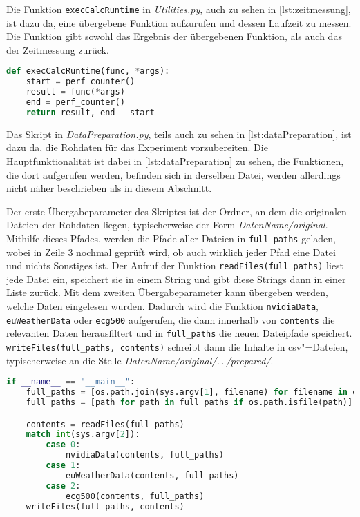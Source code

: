Die Funktion \lstinline|execCalcRuntime| in \textit{Utilities.py}, auch zu sehen in \autoref{lst:zeitmessung}, ist dazu da, eine übergebene Funktion aufzurufen und dessen Laufzeit zu messen. Die Funktion gibt sowohl das Ergebnis der übergebenen Funktion, als auch das der Zeitmessung zurück.
\begin{lstlisting}[caption=Funktion zur Zeitmessung, language=Python, label=lst:zeitmessung, style=Python]
def execCalcRuntime(func, *args):
    start = perf_counter()
    result = func(*args)
    end = perf_counter()
    return result, end - start
\end{lstlisting}

Das Skript in \textit{DataPreparation.py}, teils auch zu sehen in \autoref{lst:dataPreparation}, ist dazu da, die Rohdaten für das Experiment vorzubereiten. Die Hauptfunktionalität ist dabei in \autoref{lst:dataPreparation} zu sehen, die Funktionen, die dort aufgerufen werden, befinden sich in derselben Datei, werden allerdings nicht näher beschrieben als in diesem Abschnitt.

Der erste Übergabeparameter des Skriptes ist der Ordner, an dem die originalen Dateien der Rohdaten liegen, typischerweise der Form \textit{DatenName/original}. Mithilfe dieses Pfades, werden die Pfade aller Dateien in \lstinline|full_paths| geladen, wobei in Zeile 3 nochmal geprüft wird, ob auch wirklich jeder Pfad eine Datei und nichts Sonstiges ist. Der Aufruf der Funktion \lstinline|readFiles(full_paths)| liest jede Datei ein, speichert sie in einem String und gibt diese Strings dann in einer Liste zurück. Mit dem zweiten Übergabeparameter kann übergeben werden, welche Daten eingelesen wurden. Dadurch wird die Funktion \lstinline|nvidiaData|, \lstinline|euWeatherData| oder \lstinline|ecg500| aufgerufen, die dann innerhalb von \lstinline|contents| die relevanten Daten herausfiltert und in \lstinline|full_paths| die neuen Dateipfade speichert. \lstinline|writeFiles(full_paths, contents)| schreibt dann die Inhalte in csv"=Dateien, typischerweise an die Stelle \textit{DatenName/original/.\,.\,/prepared/}.
\begin{lstlisting}[caption=Funktion zur Zeitmessung, language=Python, label=lst:dataPreparation, style=Python]
if __name__ == "__main__":
    full_paths = [os.path.join(sys.argv[1], filename) for filename in os.listdir(sys.argv[1])]
    full_paths = [path for path in full_paths if os.path.isfile(path)]

    contents = readFiles(full_paths)
    match int(sys.argv[2]):
        case 0:
            nvidiaData(contents, full_paths)
        case 1:
            euWeatherData(contents, full_paths)
        case 2:
            ecg500(contents, full_paths)
    writeFiles(full_paths, contents)
\end{lstlisting}

